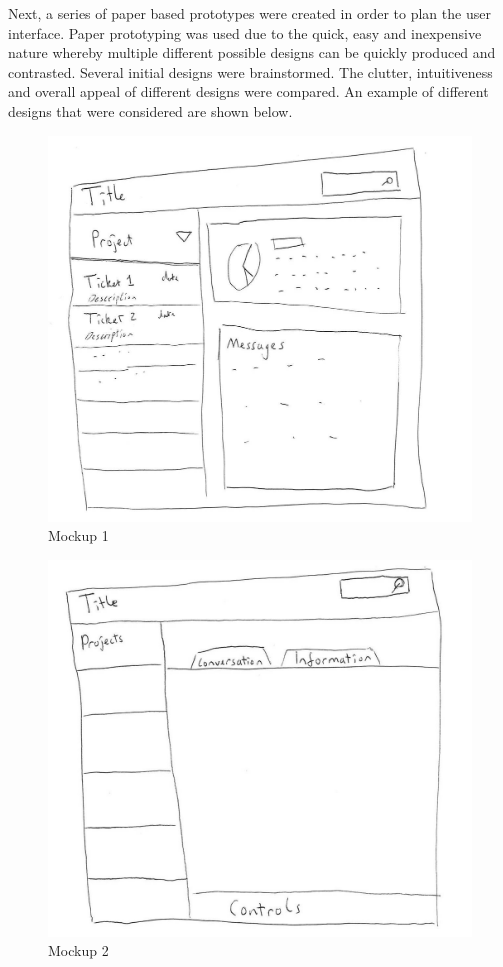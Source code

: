 \documentclass[a4paper]{l3proj}
\begin{document}
Next, a series of paper based prototypes were created in order to plan the user interface. Paper prototyping was used due to the quick, easy and inexpensive nature whereby multiple different possible designs can be quickly produced and contrasted. Several initial designs were brainstormed. The clutter, intuitiveness and overall appeal of different designs were compared.  An example of different designs that were considered are shown below. \par

\begin{figure}[ht]
\centering
\includegraphics[scale=0.2]{mockup1}
\caption{Mockup 1}
\label{fig:mockup1}
\end{figure}

\begin{figure}[ht]
\centering
\includegraphics[scale=0.2]{mockup2}
\caption{Mockup 2}
\label{fig:mockup2}
\end{figure}
\end{document}
